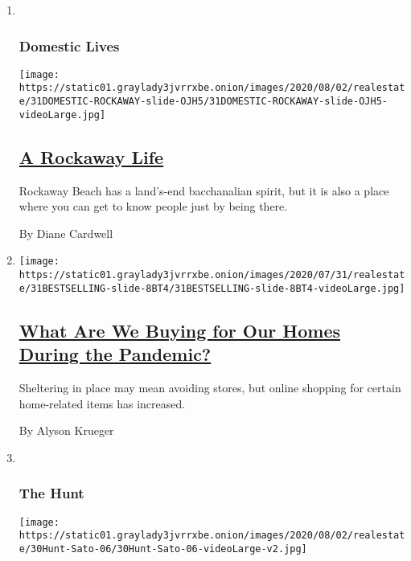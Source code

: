 \begin{enumerate}
\def\labelenumi{\arabic{enumi}.}
\item ~
  \hypertarget{domestic-lives}{%
  \subsubsection{Domestic Lives}\label{domestic-lives}}

  \texttt{[image: https://static01.graylady3jvrrxbe.onion/images/2020/08/02/realestate/31DOMESTIC-ROCKAWAY-slide-OJH5/31DOMESTIC-ROCKAWAY-slide-OJH5-videoLarge.jpg]}

  \hypertarget{a-rockaway-life}{%
  \subsection{\texorpdfstring{\href{/2020/07/31/realestate/a-rockaway-beach-queens-life.html}{A
  Rockaway Life}}{A Rockaway Life}}\label{a-rockaway-life}}

  Rockaway Beach has a land's-end bacchanalian spirit, but it is also a
  place where you can get to know people just by being there.

  By Diane Cardwell
\item
  \texttt{[image: https://static01.graylady3jvrrxbe.onion/images/2020/07/31/realestate/31BESTSELLING-slide-8BT4/31BESTSELLING-slide-8BT4-videoLarge.jpg]}

  \hypertarget{what-are-we-buying-for-our-homes-during-the-pandemic}{%
  \subsection{\texorpdfstring{\href{/2020/07/31/realestate/pandemic-shopping-home-design.html}{What
  Are We Buying for Our Homes During the
  Pandemic?}}{What Are We Buying for Our Homes During the Pandemic?}}\label{what-are-we-buying-for-our-homes-during-the-pandemic}}

  Sheltering in place may mean avoiding stores, but online shopping for
  certain home-related items has increased.

  By Alyson Krueger
\item ~
  \hypertarget{the-hunt}{%
  \subsubsection{The Hunt}\label{the-hunt}}

  \texttt{[image: https://static01.graylady3jvrrxbe.onion/images/2020/08/02/realestate/30Hunt-Sato-06/30Hunt-Sato-06-videoLarge-v2.jpg]}


\end{enumerate}
